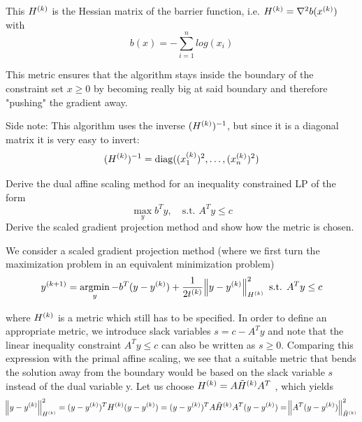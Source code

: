 \documentclass[12pt,a4paper]{article}
\begin{document}
This $\kth{H}$ is the Hessian matrix of the barrier function, i.e. $\kth{H} = \nabla^2 b(\kth{x})$ with
\begin{equation*}
    b(x) = - \sum_{i=1}^n log(x_i)
\end{equation*}

This metric ensures that the algorithm stays inside the boundary of the constraint set $x \geq 0$ by becoming really big at said boundary and therefore "pushing" the gradient away.

Side note: This algorithm uses the inverse $(\kth{H})^{-1}$, but since it is a diagonal matrix it is very easy to invert:
\begin{equation*}
    (\kth{H})^{-1} = \diag((\kth{x}_1)^{2}, \dots, (\kth{x}_n)^{2})
\end{equation*}

\begin{question}
Derive the dual affine scaling method for an inequality constrained LP of the form 
\begin{equation*}
  \max_y b^Ty, \quad\text{s.t. }A^Ty\leq c
\end{equation*}
Derive the scaled gradient projection method and show how the metric is chosen.
\end{question}

We consider a scaled gradient projection method (where we first turn the maximization problem in an equivalent minimization problem)
\begin{equation*}
    \kth[k+1]{y} = \argmin_y -b^T (y - \kth{y}) + \frac{1}{2\kth{t}} \norm{y - \kth{y}}^2_{\kth{H}} \text{ s.t. } A^Ty \leq c
\end{equation*}

where $\kth{H}$ is a metric which still has to be specified. In order to define an appropriate metric, we introduce slack variables $s = c - A^T y$ and note that the linear inequality constraint $A^T y \leq c$ can also be written as $s \geq 0$.
Comparing this expression with the primal affine scaling, we see that a suitable metric that bends the solution away from the boundary would be based on the slack variable $s$ instead of the dual variable y. Let us choose $\kth{H} = A\kth{\tilde{H}}A^T$ , which yields
\begin{equation*}
    \norm{y - \kth{y}}^2_{\kth{H}} = (y - \kth{y})^T \kth{H} (y - \kth{y}) = (y - \kth{y})^T A \kth{\tilde{H}} A^T (y - \kth{y}) = \norm{A^T (y - \kth{y})}^2_{\kth{\tilde{H}}}
\end{equation*}
\end{document}
